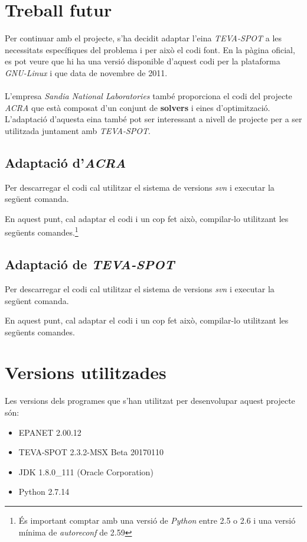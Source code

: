 \documentclass[12pt]{article}
\begin{document}
\clearpage
\section{Treball futur}
Per continuar amb el projecte, s'ha decidit adaptar l'eina \textit{TEVA-SPOT} a les necessitats específiques del problema i per això el codi font\cite{codi}. En la pàgina oficial, es pot veure que hi ha una versió disponible d'aquest codi per la plataforma \textit{GNU-Linux} i que data de novembre de 2011. 
\\\\L'empresa \textit{Sandia National Laboratories} també proporciona el codi del projecte \textit{ACRA} que està composat d'un conjunt de \textbf{solvers} i eines d'optimització. L'adaptació d'aquesta eina també pot ser interessant a nivell de projecte per a ser utilitzada juntament amb \textit{TEVA-SPOT}.
\subsection{Adaptació d'\textit{ACRA}}
Per descarregar el codi cal utilitzar el sistema de versions \textit{svn} i executar la següent comanda.

En aquest punt, cal adaptar el codi i un cop fet això, compilar-lo utilitzant les següents comandes.\footnote{És important comptar amb una versió de \textit{Python} entre 2.5 o 2.6 i una versió mínima de \textit{autoreconf} de 2.59}


\subsection{Adaptació de \textit{TEVA-SPOT}}
Per descarregar el codi cal utilitzar el sistema de versions \textit{svn} i executar la següent comanda.

En aquest punt, cal adaptar el codi i un cop fet això, compilar-lo utilitzant les següents comandes.




\clearpage
\section{Versions utilitzades}
Les versions dels programes que s'han utilitzat per desenvolupar aquest projecte són:
\begin{itemize}
	\item EPANET 2.00.12
	\item TEVA-SPOT 2.3.2-MSX Beta 20170110
	\item JDK 1.8.0\_111 (Oracle Corporation)
	\item Python 2.7.14
\end{itemize}
\end{document}
